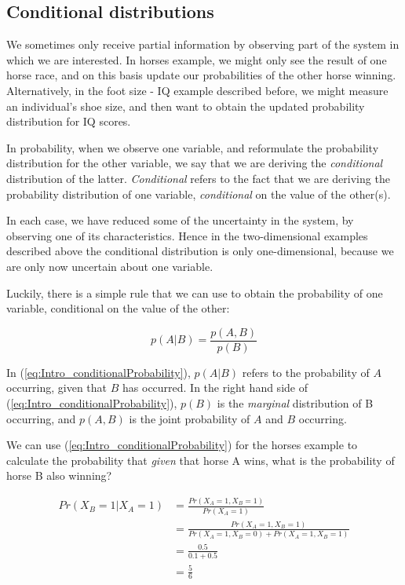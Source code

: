 \documentclass[11pt,fullpage]{book}
\begin{document}
\subsection{Conditional distributions}
We sometimes only receive partial information by observing part of the system in which we are interested. In horses example, we might only see the result of one horse race, and on this basis update our probabilities of the other horse winning. Alternatively, in the foot size - IQ example described before, we might measure an individual's shoe size, and then want to obtain the updated probability distribution for IQ scores.

In probability, when we observe one variable, and reformulate the probability distribution for the other variable, we say that we are deriving the \textit{conditional} distribution of the latter. \textit{Conditional} refers to the fact that we are deriving the probability distribution of one variable, \textit{conditional} on the value of the other(s).

In each case, we have reduced some of the uncertainty in the system, by observing one of its characteristics. Hence in the two-dimensional examples described above the conditional distribution is only one-dimensional, because we are only now uncertain about one variable. 

Luckily, there is a simple rule that we can use to obtain the probability of one variable, conditional on the value of the other:

\begin{equation}\label{eq:Intro_conditionalProbability}
p(A|B) = \frac{p(A,B)}{p(B)}
\end{equation}

In (\ref{eq:Intro_conditionalProbability}), $p(A|B)$ refers to the probability of $A$ occurring, given that $B$ has occurred. In the right hand side of (\ref{eq:Intro_conditionalProbability}), $p(B)$ is the \textit{marginal} distribution of B occurring, and $p(A,B)$ is the joint probability of $A$ and $B$ occurring.

We can use (\ref{eq:Intro_conditionalProbability}) for the horses example to calculate the probability that \textit{given} that horse A wins, what is the probability of horse B also winning?

\begin{equation}\label{eq:Intro_conditionalDiscreteCoins}
\begin{align}
Pr(X_B=1|X_A=1) &= \frac{Pr(X_A=1,X_B=1)}{Pr(X_A=1)}\\
&= \frac{Pr(X_A=1,X_B=1)}{Pr(X_A=1,X_B=0)+Pr(X_A=1,X_B=1)}\\
&= \frac{0.5}{0.1 + 0.5}\\ 
&= \frac{5}{6}
\end{align}
\end{equation}
\end{document}

